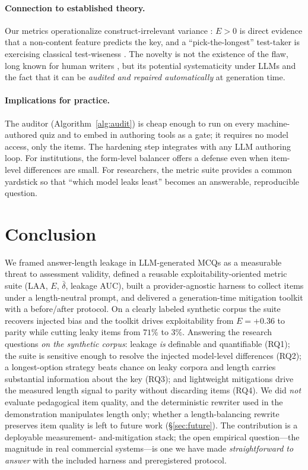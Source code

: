 \documentclass[10pt,twocolumn]{article}
\begin{document}
\paragraph{Connection to established theory.} Our metrics operationalize
construct-irrelevant variance \citep{messick1989validity}: $E>0$ is direct
evidence that a non-content feature predicts the key, and a ``pick-the-longest''
test-taker is exercising classical test-wiseness
\citep{millman1965testwiseness}. The novelty is not the existence of the flaw,
long known for human writers \citep{haladyna2002review,tarrant2006frequency},
but its potential systematicity under LLMs and the fact that it can be
\emph{audited and repaired automatically} at generation time.

\paragraph{Implications for practice.} The auditor (Algorithm~\ref{alg:audit})
is cheap enough to run on every machine-authored quiz and to embed in
authoring tools as a gate; it requires no model access, only the items. The
hardening step integrates with any LLM authoring loop. For institutions, the
form-level balancer offers a defense even when item-level differences are
small. For researchers, the metric suite provides a common yardstick so that
``which model leaks least'' becomes an answerable, reproducible question.

\section{Conclusion}
\label{sec:conclusion}

We framed answer-length leakage in LLM-generated MCQs as a measurable threat to
assessment validity, defined a reusable exploitability-oriented metric suite
(LAA, $E$, $\bar\delta$, leakage AUC), built a provider-agnostic harness to
collect items under a length-neutral prompt, and delivered a generation-time
mitigation toolkit with a before/after protocol. On a clearly labeled synthetic
corpus the suite recovers injected bias and the toolkit drives exploitability
from $E={+}0.36$ to parity while cutting leaky items from $71\%$ to $3\%$.
Answering the research questions \emph{on the synthetic corpus}: leakage
\emph{is} definable and quantifiable (RQ1); the suite is sensitive enough to
resolve the injected model-level differences (RQ2); a longest-option strategy
beats chance on leaky corpora and length carries substantial information about the
key (RQ3); and lightweight mitigations drive the measured length signal to parity
without discarding items (RQ4). We did \emph{not} evaluate pedagogical item
quality, and the deterministic rewriter used in the demonstration manipulates
length only; whether a length-balancing rewrite preserves item quality is left to
future work (\S\ref{sec:future}). The contribution is a deployable measurement-
and-mitigation stack; the open empirical question---the magnitude in real
commercial systems---is one we have made \emph{straightforward to answer} with
the included harness and preregistered protocol.
\end{document}
